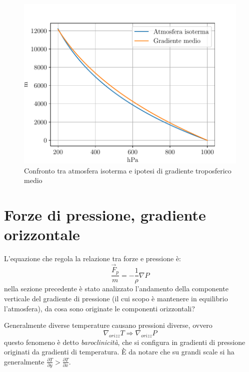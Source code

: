 \begin{figure}[h]     				\centering                                                                  
   \includegraphics[width=.65\textwidth]{figures/iso_vs_grad.pdf} 
	\caption{Confronto tra atmosfera isoterma e ipotesi di gradiente troposferico medio}          
   \label{fig:iso_vs_grad}
\end{figure}         
\section{Forze di pressione, gradiente orizzontale}
L'equazione che regola la relazione tra forze e pressione è:
\begin{equation}
	\frac{\vec{F}_p}{m}=-\frac{1}{\rho}\nabla P
\end{equation}
nella sezione precedente è stato analizzato l'andamento della componente verticale del gradiente di pressione (il cui scopo è mantenere in equilibrio l'atmosfera), da cosa sono originate le componenti orizzontali? 

Generalmente diverse temperature causano pressioni diverse, ovvero
\begin{equation*}
	\nabla_{orizz} T \Rightarrow \nabla_{orizz} P
\end{equation*}
questo fenomeno è detto \emph{baroclinicità}, che si configura in gradienti di pressione originati da gradienti di temperatura. È da notare che su grandi scale si ha generalmente $\frac{\partial T}{\partial y} > \frac{\partial T}{\partial x}$.